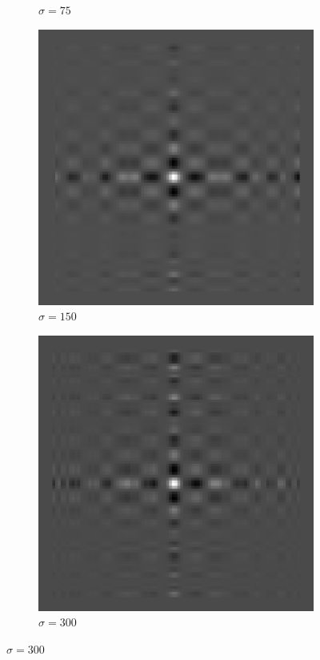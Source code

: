 \begin{figure}[htpb]
\begin{subfigure}{.25\textwidth}
\caption{$\sigma = 75$}
\end{subfigure}%
\begin{subfigure}{.25\textwidth}
\includegraphics[width=1\textwidth]{img/NGCRank1sigma150}
\caption{$\sigma = 150$}
\end{subfigure}%
\begin{subfigure}{.25\textwidth}
\includegraphics[width=1\textwidth]{img/NGCRank1sigma300}
\caption{$\sigma = 300$}
\end{subfigure}


\end{figure}
